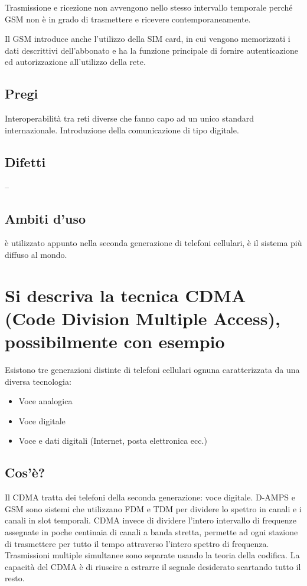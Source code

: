 Trasmissione e ricezione non avvengono nello stesso intervallo temporale perché GSM non è in grado di trasmettere e ricevere contemporaneamente.

Il GSM introduce anche l’utilizzo della SIM card, in cui vengono memorizzati i dati descrittivi dell’abbonato e ha la funzione principale di fornire autenticazione ed autorizzazione all’utilizzo della rete.

\subsection{Pregi}
Interoperabilità tra reti diverse che fanno capo ad un unico standard internazionale.
Introduzione della comunicazione di tipo digitale.
\subsection{Difetti}
--
\subsection{Ambiti d'uso}
è utilizzato appunto nella seconda generazione di telefoni cellulari, è il sistema più diffuso al mondo.

\section{Si descriva la tecnica CDMA (Code Division Multiple Access), possibilmente con esempio}
Esistono tre generazioni distinte di telefoni cellulari ognuna caratterizzata da una diversa tecnologia:
\begin{itemize}
\item	Voce analogica
\item	Voce digitale
\item	Voce e dati digitali (Internet, posta elettronica ecc.)
\end{itemize}
\subsection{Cos'è?}
Il CDMA tratta dei telefoni della seconda generazione: voce digitale.
D-AMPS e GSM sono sistemi che utilizzano FDM e TDM per dividere lo spettro in canali e i canali in slot temporali. CDMA invece di dividere l’intero intervallo di frequenze assegnate in poche centinaia di canali a banda stretta, permette ad ogni stazione di trasmettere per tutto il tempo attraverso l’intero spettro di frequenza. Trasmissioni multiple simultanee sono separate usando la teoria della codifica. La capacità del CDMA è di riuscire a estrarre il segnale desiderato scartando tutto il resto.

